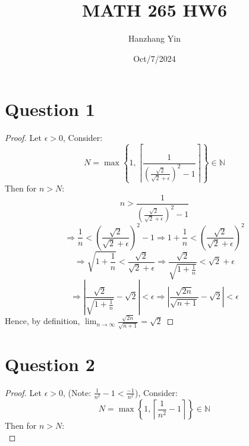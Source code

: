 \documentclass{article}
\title{MATH 265 HW6}
\author{Hanzhang Yin}
\date{Oct/7/2024}
\begin{document}
\maketitle

\section*{Question 1}
\begin{proof}
    Let $\epsilon > 0$, Consider:
    \[ N = \max\left\{1, \left\lceil \frac{1}{\left( \frac{\sqrt{2}}{\sqrt{2} + \epsilon} \right)^2 - 1 } \right\rceil \right\} \in \mathbb{N} \]
    Then for $n > N$:
    \[ n > \frac{1}{\left( \frac{\sqrt{2}}{\sqrt{2} + \epsilon} \right)^2 - 1} \]
    \[ \Rightarrow \frac{1}{n} < \left( \frac{\sqrt{2}}{\sqrt{2} + \epsilon} \right)^2 - 1 \Rightarrow 1 + \frac{1}{n} < \left( \frac{\sqrt{2}}{\sqrt{2} + \epsilon} \right)^2 \]
    \[ \Rightarrow \sqrt{1 + \frac{1}{n}} < \frac{\sqrt{2}}{\sqrt{2} + \epsilon} \Rightarrow \frac{\sqrt{2}}{\sqrt{1 + \frac{1}{n}}} < \sqrt{2} + \epsilon \]
    \[ \Rightarrow \left| \frac{\sqrt{2}}{\sqrt{1 + \frac{1}{n}}} - \sqrt{2} \right| < \epsilon \Rightarrow \left| \frac{\sqrt{2n}}{\sqrt{n + 1}} - \sqrt{2} \right| < \epsilon \]
    Hence, by definition, \( \lim_{n \to \infty} \frac{\sqrt{2n}}{\sqrt{n + 1}} = \sqrt{2} \)
\end{proof}

\section*{Question 2}
\begin{proof}
    Let $\epsilon > 0$, (Note: $\frac{1}{n^2} - 1 < \frac{-1}{n^2}$), Consider:
    \[ N = \max \left\{1, \left\lceil \frac{1}{n^2} -1 \right\rceil \right\} \in \mathbb{N} \]
    Then for $n > N$:
    \[ \]
\end{proof}
\end{document}
